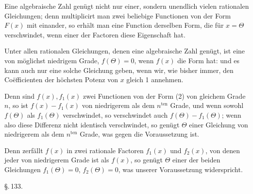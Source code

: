 
Eine algebraische Zahl gen\"ugt nicht nur einer, sondern unendlich vielen rationalen Gleichungen; denn multiplicirt man zwei beliebige Functionen von der Form $F(x)$ mit einander, so erh\"alt man eine Function derselben Form, die f\"ur $x = \Theta$ verschwindet, wenn einer der Factoren diese Eigenschaft hat.

Unter allen rationalen Gleichungen, denen eine algebraische Zahl gen\"ugt, ist eine von m\"oglichst niedrigem Grade, $f(\Theta) = 0$, wenn $f(x)$ die Form hat:
und es kann auch nur eine solche Gleichung geben, wenn wir, wie bisher immer, den Co\"efficienten der h\"ochsten Potenz von $x$ gleich 1 annehmen.

Denn sind $f(x), f_1(x)$ zwei Functionen von der Form (2) von gleichem Grade $n$, so ist $f(x) - f_1(x)$ von niedrigerem als dem $n^{\text{ten}}$ Grade, und wenn sowohl $f(\Theta)$ als $f_1(\Theta)$ verschwindet, so verschwindet auch $f(\Theta) - f_1(\Theta)$; wenn also diese Differenz nicht identisch verschwindet, so gen\"ugt $\Theta$ einer Gleichung von niedrigerem als dem $n^{\text{ten}}$ Grade, was gegen die Voraussetzung ist.


Denn zerf\"allt $f(x)$ in zwei rationale Factoren $f_1(x)$ und $f_2(x)$, von denen jeder von niedrigerem Grade ist als $f(x)$, so gen\"ugt $\Theta$ einer der beiden Gleichungen $f_1(\Theta) = 0$, $f_2(\Theta) = 0$, was unserer Voraussetzung widerspricht.


\begin{center}
\S.\,133.

\end{center}

